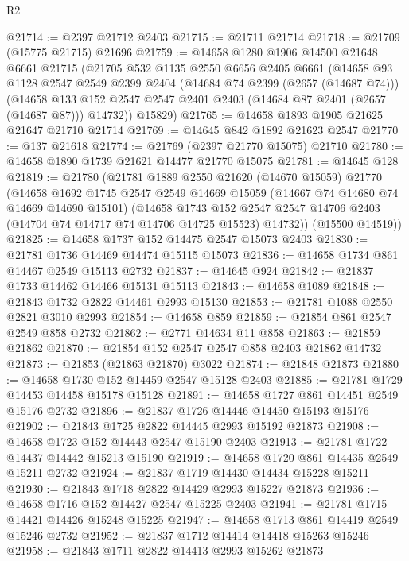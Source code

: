 \begin{lexlean}{R2}
\begin{coremodule}
@21714 := @2397 @21712 @2403
@21715 := @21711 @21714
@21718 := @21709 (@15775 @21715) @21696
@21759 := @14658
    @1280
    @1906
    @14500
    @21648
    @6661
    @21715
    (@21705
      @532
      @1135
      @2550
      @6656
      @2405
      @6661
      (@14658
        @93
        @1128
        @2547
        @2549
        @2399
        @2404
        (@14684 @74 @2399 (@2657 (@14687 @74)))
        (@14658 @133 @152 @2547 @2547 @2401 @2403 (@14684 @87 @2401 (@2657 (@14687 @87))) @14732))
      @15829)
@21765 := @14658 @1893 @1905 @21625 @21647 @21710 @21714
@21769 := @14645 @842 @1892 @21623 @2547
@21770 := @137 @21618
@21774 := @21769 (@2397 @21770 @15075) @21710
@21780 := @14658 @1890 @1739 @21621 @14477 @21770 @15075
@21781 := @14645 @128
@21819 := @21780
    (@21781
      @1889
      @2550
      @21620
      (@14670 @15059)
      @21770
      (@14658
        @1692
        @1745
        @2547
        @2549
        @14669
        @15059
        (@14667 @74 @14680 @74 @14669 @14690 @15101)
        (@14658
          @1743
          @152
          @2547
          @2547
          @14706
          @2403
          (@14704 @74 @14717 @74 @14706 @14725 @15523)
          @14732))
      (@15500 @14519))
@21825 := @14658 @1737 @152 @14475 @2547 @15073 @2403
@21830 := @21781 @1736 @14469 @14474 @15115 @15073
@21836 := @14658 @1734 @861 @14467 @2549 @15113 @2732
@21837 := @14645 @924
@21842 := @21837 @1733 @14462 @14466 @15131 @15113
@21843 := @14658 @1089
@21848 := @21843 @1732 @2822 @14461 @2993 @15130
@21853 := @21781 @1088 @2550 @2821 @3010 @2993
@21854 := @14658 @859
@21859 := @21854 @861 @2547 @2549 @858 @2732
@21862 := @2771 @14634 @11 @858
@21863 := @21859 @21862
@21870 := @21854 @152 @2547 @2547 @858 @2403 @21862 @14732
@21873 := @21853 (@21863 @21870) @3022
@21874 := @21848 @21873
@21880 := @14658 @1730 @152 @14459 @2547 @15128 @2403
@21885 := @21781 @1729 @14453 @14458 @15178 @15128
@21891 := @14658 @1727 @861 @14451 @2549 @15176 @2732
@21896 := @21837 @1726 @14446 @14450 @15193 @15176
@21902 := @21843 @1725 @2822 @14445 @2993 @15192 @21873
@21908 := @14658 @1723 @152 @14443 @2547 @15190 @2403
@21913 := @21781 @1722 @14437 @14442 @15213 @15190
@21919 := @14658 @1720 @861 @14435 @2549 @15211 @2732
@21924 := @21837 @1719 @14430 @14434 @15228 @15211
@21930 := @21843 @1718 @2822 @14429 @2993 @15227 @21873
@21936 := @14658 @1716 @152 @14427 @2547 @15225 @2403
@21941 := @21781 @1715 @14421 @14426 @15248 @15225
@21947 := @14658 @1713 @861 @14419 @2549 @15246 @2732
@21952 := @21837 @1712 @14414 @14418 @15263 @15246
@21958 := @21843 @1711 @2822 @14413 @2993 @15262 @21873

\end{coremodule}
\end{lexlean}
